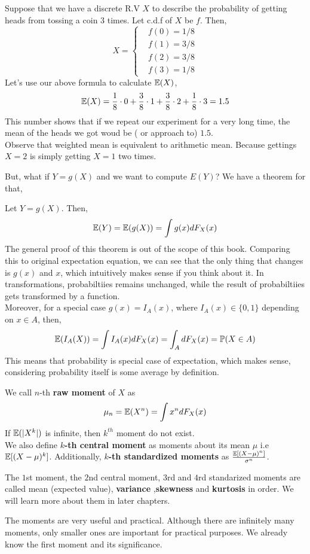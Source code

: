 \begin{example}
    Suppose that we have  a discrete R.V $X$ to describe the probability of getting heads from tossing a coin $3$ times.  Let  c.d.f of $X$ be $f$. Then,
    \[X = \begin{cases}
        &f(0) = 1/8\\
        &f(1) = 3/8 \\
        &f(2) = 3/8 \\
        &f(3) = 1/8
    \end{cases}\]
    Let's use our above formula to calculate ${\mathbb{E}}(X)$,
    \[{\mathbb{E}}(X) =  \frac{1}{8} \cdot 0 + \frac{3}{8} \cdot 1 + \frac{3}{8} \cdot 2 + \frac{1}{8} \cdot 3 = 1.5\]
    This number shows that if we repeat our experiment for a very long time, the mean of the heads we got woud be  ( or approach to) $1.5$.
    \\Observe that weighted mean is equivalent to arithmetic mean. Because gettings $X=2$ is simply getting $X=1$ two times.
\end{example}
\par
\vspace{10cm}
But, what if $Y= g(X)$ and we want to compute $E(Y)$? We have a theorem for that,
\begin{theorem}
    Let $Y = g(X)$. Then,
    \[\mathbb{E}(Y)= {\mathbb{E}} (g(X))= \int g(x) dF_X(x)\]
       The general proof of this theorem is out of the scope of this book. Comparing this to original expectation equation, we can see that the only thing that changes is $g(x)$ and $x$, which intuitively makes sense if you think about it. In transformations, probabiltiies remains unchanged, while the result of probabiltiies gets transformed by a function.
       \\ Moreover, for a special case $g(x) = I_A(x)$, where $I_A(x) \in \{ 0,1\}$ depending on $x \in A$, then,
       \[{\mathbb{E}} (I_A(X)) = \int I_A(x) d F_X(x) = \int_A dF_X(x) = \mathbb{P} (X \in A)\]
       This means that probability is special case of expectation, which makes sense, considering probability itself is some average by definition.
\end{theorem}
\begin{definition}
We call  $n$-th \textbf{ raw moment} of $X$ as 
\[ \mu_n = {\mathbb{E}} (X^n) = \int x^n dF_X(x)\] 
If $ {\mathbb{E}} ( |X^k|)$ is infinite, then $k^{th}$ moment do not exist.\\
We also define \textbf{ $k$-th central moment} as moments about its mean $\mu$ i.e ${\mathbb{E}} [(X - \mu)^k   ]$. Additionally, \textbf{ $k$-th standardized moments} as $\frac{{\mathbb{E}} [ (X - \mu)^n]}{\sigma^n}$.
\par
The $1$st moment, the $2$nd central moment, $3$rd  and $4$rd standarized moments are called mean (expected value), \textbf{variance} ,\textbf{skewness} and \textbf{kurtosis} in order. We will learn more about them in later chapters.

\par 
The moments are very useful and practical. Although there  are infinitely many moments, only smaller ones are important for practical purposes. We already know the first moment and its significance. 
\end{definition}
